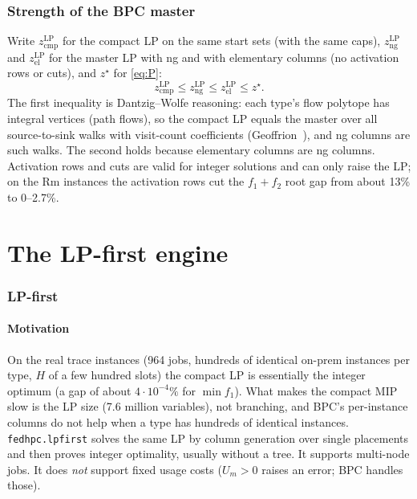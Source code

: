 \documentclass[11pt,a4paper]{article}
\theoremstyle{definition}
\theoremstyle{remark}
\newcommand{\code}[1]{\texttt{#1}}
\begin{document}
\section{Strength of the BPC master}\label{sec:strength}

Write $z^{\mathrm{LP}}_{\mathrm{cmp}}$ for the compact LP on the same start sets
(with the same caps), $z^{\mathrm{LP}}_{\mathrm{ng}}$ and
$z^{\mathrm{LP}}_{\mathrm{el}}$ for the master LP with ng and with elementary
columns (no activation rows or cuts), and $z^\star$ for \eqref{eq:P}:
\[
z^{\mathrm{LP}}_{\mathrm{cmp}}\le z^{\mathrm{LP}}_{\mathrm{ng}}\le z^{\mathrm{LP}}_{\mathrm{el}}\le z^\star .
\]
The first inequality is Dantzig--Wolfe reasoning: each type's flow polytope has
integral vertices (path flows), so the compact LP equals the master over all
source-to-sink walks with visit-count coefficients (Geoffrion~\cite{geoffrion1974}),
and ng columns are such walks. The second holds because elementary columns are
ng columns. Activation rows and cuts are valid for integer solutions and can
only raise the LP; on the Rm instances the activation rows cut the
$f_1+f_2$ root gap from about 13\% to 0--2.7\%.

\part*{The LP-first engine}

\section{LP-first}\label{sec:lpfirst}

\subsection{Motivation}
On the real trace instances (964 jobs, hundreds of identical on-prem instances
per type, $H$ of a few hundred slots) the compact LP is essentially the integer
optimum (a gap of about $4\cdot10^{-4}\%$ for $\min f_1$). What makes the compact
MIP slow is the LP size (7.6 million variables), not branching, and BPC's
per-instance columns do not help when a type has hundreds of identical
instances. \code{fedhpc.lpfirst} solves the same LP by column generation over
single placements and then proves integer optimality, usually without a tree.
It supports multi-node jobs. It does \emph{not} support fixed usage costs
($U_m>0$ raises an error; BPC handles those).
\end{document}
